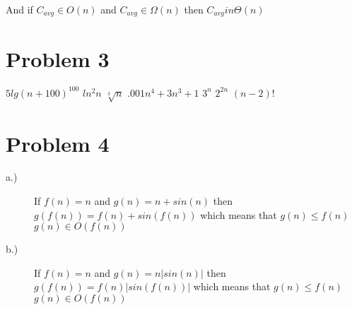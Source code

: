 \documentclass[12pt,letterpaper]{article}
\begin{document}
\begin{description}
    And if $C_{avg} \in O(n)$ and $C_{avg} \in \Omega(n)$ then $C_{avg} in \Theta(n)$ 
    
\end{description}

\section*{Problem 3}

$5lg(n+100)^{100}$ \xrightarrow{} $ln^2n$ \xrightarrow{} $\sqrt[3]{n}$ \xrightarrow{} $.001n^4+3n^3+1$ \xrightarrow{} $3^n$ \xrightarrow{} $2^{2n}$ \xrightarrow{} $(n-2)!$

\section*{Problem 4}

\begin{description}
    \item[a.)] If $f(n) = n$ and $g(n) = n + sin(n)$ then $g(f(n)) = f(n) + sin(f(n))$ which means that $g(n) \leq f(n)$ \therefore $g(n) \in O(f(n))$ 
    \item[b.)] If $f(n) = n$ and $g(n) = n|sin(n)|$ then $g(f(n)) = f(n)|sin(f(n))|$ which means that $g(n) \leq f(n)$ \therefore $g(n) \in O(f(n))$ 
    
\end{description}
\end{document}

